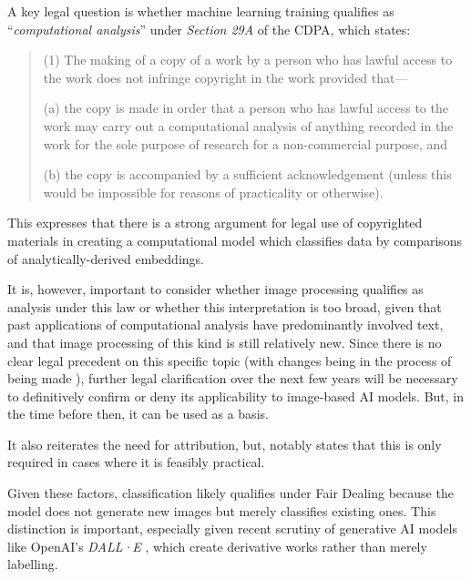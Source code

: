                   A key legal question is whether machine learning training qualifies as ``\textit{computational analysis}'' under \textit{Section 29A} of the CDPA, which states:
                  \begin{quote}
                      (1) The making of a copy of a work by a person who has lawful access to the work does not infringe copyright in the work provided that—
                  
                          (a) the copy is made in order that a person who has lawful access to the work may carry out a computational analysis of anything recorded in the work for the sole purpose of research for a non-commercial purpose, and
                          
                          (b) the copy is accompanied by a sufficient acknowledgement (unless this would be impossible for reasons of practicality or otherwise). \cite{cdpa1988}
                  \end{quote}
    
                  This expresses that there is a strong argument for legal use of copyrighted materials in creating a computational model which classifies data by comparisons of analytically-derived embeddings.
    
                  It is, however, important to consider whether image processing qualifies as analysis under this law or whether this interpretation is too broad, given that past applications of computational analysis have predominantly involved text, and that image processing of this kind is still relatively new. Since there is no clear legal precedent on this specific topic (with changes being in the process of being made \cite{guardian2024uk_ai_copyright}), further legal clarification over the next few years will be necessary to definitively confirm or deny its applicability to image-based AI models. But, in the time before then, it can be used as a basis.
    
                  It also reiterates the need for attribution, but, notably states that this is only required in cases where it is feasibly practical.
    
                  Given these factors, classification likely qualifies under Fair Dealing because the model does not generate new images but merely classifies existing ones. This distinction is important, especially given recent scrutiny of generative AI models like OpenAI’s \textit{DALL·E} \cite{times2025christies_ai_auction, guardian2025ai_art_auction}, which create derivative works rather than merely labelling.
    

